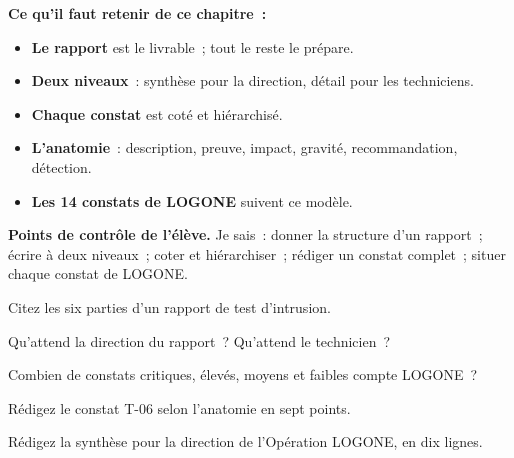 \separateur

\begin{boxresume}
\textbf{Ce qu'il faut retenir de ce chapitre~:}
\begin{itemize}
    \item \textbf{Le rapport} est le livrable~; tout le reste le prépare.
    \item \textbf{Deux niveaux}~: synthèse pour la direction, détail pour les
          techniciens.
    \item \textbf{Chaque constat} est coté et hiérarchisé.
    \item \textbf{L'anatomie}~: description, preuve, impact, gravité,
          recommandation, détection.
    \item \textbf{Les 14 constats de LOGONE} suivent ce modèle.
\end{itemize}
\end{boxresume}

\begin{boxinfo}
\textbf{Points de contrôle de l'élève.} Je sais~: donner la structure d'un
rapport~; écrire à deux niveaux~; coter et hiérarchiser~; rédiger un constat
complet~; situer chaque constat de LOGONE.
\end{boxinfo}

\bigskip

\begin{boxexo}[title={\ding{45}\quad Exercice~22.1. Structure \niveaubase}]
Citez les six parties d'un rapport de test d'intrusion.
\end{boxexo}

\begin{boxexo}[title={\ding{45}\quad Exercice~22.2. Deux lecteurs \niveaubase}]
Qu'attend la direction du rapport~? Qu'attend le technicien~?
\end{boxexo}

\begin{boxexo}[title={\ding{45}\quad Exercice~22.3. Répartition \niveaubase}]
Combien de constats critiques, élevés, moyens et faibles compte LOGONE~?
\end{boxexo}

\begin{boxexo}[title={\ding{45}\quad Exercice~22.4. Anatomie \niveaumoyen}]
Rédigez le constat T-06 selon l'anatomie en sept points.
\end{boxexo}

\begin{boxexo}[title={\ding{45}\quad Exercice~22.5. Synthèse \niveaumoyen}]
Rédigez la synthèse pour la direction de l'Opération LOGONE, en dix lignes.
\end{boxexo}

